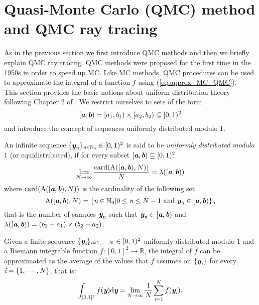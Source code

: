 \section{Quasi-Monte Carlo (QMC) method and QMC ray tracing}\label{sec:QMC}
As in the previous section we first introduce QMC methods and then we briefly explain QMC ray tracing. QMC methods were proposed for the first time in the 1950s in order to speed up MC. Like MC methods, QMC procedures can be used to approximate the integral of a function $f$ using (\ref{eq:approx_MC_QMC}).\\ \indent
This section provides the basic notions about uniform distribution theory following Chapter $2$ of \cite{leobacher2014introduction}. 
We restrict ourselves to sets of the form $$[\textit{\textbf{a}}, \textit{\textbf{b}})= [a_1,b_1)\times[a_2, b_2)\subseteq[0,1)^2$$ and introduce the concept of sequences uniformly distributed modulo $1$.
\begin{definition}
An infinite sequence $\{\textit{\textbf{y}}_{\textit{n}}\}_{\textit{n}\in\mathbb{N}_0} \in [0,1)^2$ is said to be \textit{uniformly distributed modulo $1$} (or equidistributed), if for every subset $[\textit{\textbf{a}},\textit{\textbf{b}})\subseteq[0,1)^2$
\begin{equation}
\lim_{N\rightarrow \infty}\frac{\textrm{card}(\mbox{$\textup{A}$}([\textit{\textbf{a}},\textit{\textbf{b}}), N))}{N} = \lambda([\textit{\textbf{a}},\textit{\textbf{b}}))
\end{equation}
where $\textrm{card}(\insieme{A}([\vect{a},\vect{b}), N))$ is the cardinality of the following set
\begin{equation}
\mbox{$\textup{A}$}([\textit{\textbf{a}},\textit{\textbf{b}}), N) = \{\textit{n}\in \mathbb{N}_0 | 0\leq\textit{n}\leq N-1 \mbox{ and } \textit{\textbf{y}}_{\textit{n}}\in [\textit{\textbf{a}},\textit{\textbf{b}})\}\,,
\end{equation} 
that is the number of samples $\textit{\textbf{y}}_{\textit{n}}$ such that $\textit{\textbf{y}}_{\textit{n}}\in [\textit{\textbf{a}},\textit{\textbf{b}})$ and $\lambda([\textit{\textbf{a}},\textit{\textbf{b}})) =(b_1-a_1)\times (b_2-a_2)$.
\end{definition}
Given a finite sequence $\{\textit{\textbf{y}}_{\textit{i}}\}_{\textit{i} = 1, \cdots, N}\in[0,1)^2$ uniformly distributed modulo $1$ and a 
Riemann integrable function $f:[0,1]^2\rightarrow \mathbb{R}$, the integral of $f$ can be approximated as the average of the values that $f$ assumes on $\{\textit{\textbf{y}}_{\textit{i}}\}$ for every $\textit{i}=\{1, \cdots, N\}$, that is:
\begin{equation}
 \int_{[0,1]^2}f(\textit{\textbf{y}})\textrm{d}\textit{\textbf{y}} = \lim_{N\rightarrow \infty}\frac{1}{N}\sum_{\textit{i}=1}^{N}f(\textit{\textbf{y}}_{\textit{i}}).
\end{equation}
